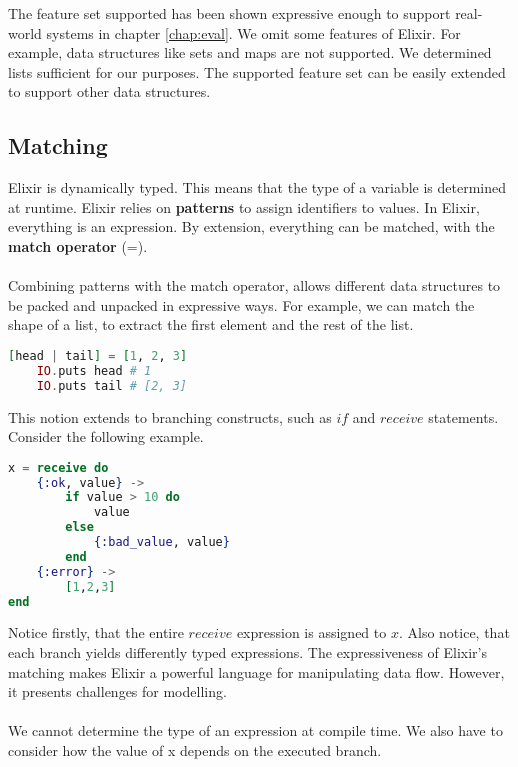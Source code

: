 The feature set supported has been shown expressive enough to support real-world systems in chapter \ref{chap:eval}. We omit some features of Elixir. For example, data structures like sets and maps are not supported. We determined lists sufficient for our purposes. The supported feature set can be easily extended to support other data structures.
\subsection{Matching}
Elixir is dynamically typed. This means that the type of a variable is determined at runtime. Elixir relies on \textbf{patterns} to assign identifiers to values. In Elixir, everything is an expression. By extension, everything can be matched, with the \textbf{match operator} (=).
\\ \\
Combining patterns with the match operator, allows different data structures to be packed and unpacked in expressive ways. For example, we can match the shape of a list, to extract the first element and the rest of the list.
\begin{lstlisting}[language=Elixir, xleftmargin=.3\linewidth]
    [head | tail] = [1, 2, 3]
    IO.puts head # 1
    IO.puts tail # [2, 3]
\end{lstlisting}
This notion extends to branching constructs, such as $if$ and $receive$ statements. Consider the following example.
\begin{lstlisting}[language=Elixir, xleftmargin=.3\linewidth]
x = receive do
    {:ok, value} ->
        if value > 10 do
            value
        else
            {:bad_value, value}
        end
    {:error} ->
        [1,2,3]
end
\end{lstlisting}
Notice firstly, that the entire $receive$ expression is assigned to $x$. Also notice, that each branch yields differently typed expressions. The expressiveness of Elixir's matching makes Elixir a powerful language for manipulating data flow. However, it presents challenges for modelling.
\\ \\
We cannot determine the type of an expression at compile time. We also have to consider how the value of x depends on the executed branch. 
